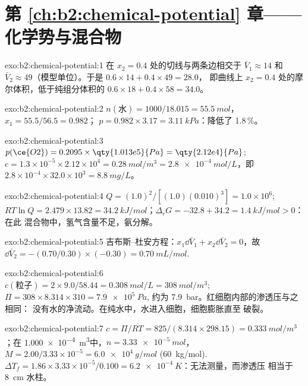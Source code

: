 \section*{第 \ref{ch:b2:chemical-potential} 章——化学势与混合物}

\begin{solution}{exo:b2:chemical-potential:1}
在 $x_2 = 0.4$ 处的切线与两条边相交于 $\bar V_1 \approx 14$ 和 $\bar
V_2 \approx 49$（模型单位）。于是 $0.6 \times 14 + 0.4 \times 49 = 28.0$，
即曲线上 $x_2 = 0.4$ 处的摩尔体积，低于纯组分体积的
$0.6 \times 18 + 0.4 \times 58 = 34.0$。
\end{solution}

\begin{solution}{exo:b2:chemical-potential:2}
$n(\text{水}) = 1000/18.015 = \qty{55.5}{mol}$，$x_1 = 55.5/56.5 = 0.982$；
$p = 0.982 \times 3.17 = \qty{3.11}{kPa}$：降低了 1.8\,\%。
\end{solution}

\begin{solution}{exo:b2:chemical-potential:3}
$p(\ce{O2}) = 0.2095 \times \qty{1.013e5}{Pa} = \qty{2.12e4}{Pa}$;
$c = 1.3 \times 10^{-5} \times 2.12 \times 10^4 = \qty{0.28}{mol/m^3} =
\qty{2.8e-4}{mol/L}$，即 $2.8 \times 10^{-4} \times 32.0 \times 10^3 =
\qty{8.8}{mg/L}$。
\end{solution}

\begin{solution}{exo:b2:chemical-potential:4}
$Q = (1.0)^2/[(1.0)(0.010)^3] = 1.0 \times 10^6$; $RT\ln Q = 2.479 \times 13.82 =
\qty{34.2}{kJ/mol}$；$\Delta_r G = -32.8 + 34.2 = \qty{+1.4}{kJ/mol} > 0$：在此
混合物中，氢气含量不足，氨分解。
\end{solution}

\begin{solution}{exo:b2:chemical-potential:5}
吉布斯–杜安方程：$x_1\dd\bar V_1 + x_2\dd\bar V_2 = 0$，故 $\dd\bar V_2 =
-(0.70/0.30) \times (-0.30) = \qty{+0.70}{mL/mol}$.
\end{solution}

\begin{solution}{exo:b2:chemical-potential:6}
$c(\text{粒子}) = 2 \times 9.0/58.44 = \qty{0.308}{mol/L} =
\qty{308}{mol/m^3}$; $\Pi = 308 \times 8.314 \times 310 = \qty{7.9e5}{Pa}$,
约为 \qty{7.9}{bar}。红细胞内部的渗透压与之相同：
没有水的净流动。在纯水中，水进入细胞，细胞膨胀直至
破裂。
\end{solution}

\begin{solution}{exo:b2:chemical-potential:7}
$c = \Pi/RT = 825/(8.314 \times 298.15) = \qty{0.333}{mol/m^3}$；在
\qty{1.000e-4}{m^3}中，$n = \qty{3.33e-5}{mol}$，$M = 2.00/3.33 \times 10^{-5}
= \qty{6.0e4}{g/mol}$ (\qty{60}{kg/mol}). $\Delta T_f = 1.86 \times 3.33
\times 10^{-5}/0.100 = \qty{6.2e-4}{K}$：无法测量，而渗透压
相当于 \qty{8}{cm} 水柱。
\end{solution}

